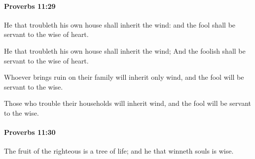 		\paragraph{Proverbs 11:29} %
			\label{PROVERBS-11-29}

			He that troubleth his own house shall inherit the wind: and the fool shall be servant to the wise of heart.

			\begin{versebox}
					\item[BHS] 
					\item[ASV] He that troubleth his own house shall inherit the wind; And the foolish shall be servant to the wise of heart.
					\item[NIV] Whoever brings ruin on their family will inherit only wind, and the fool will be servant to the wise.
					\item[NRSV] Those who trouble their households will inherit wind, and the fool will be servant to the wise.
			\end{versebox}

		\paragraph{Proverbs 11:30} %
			\label{PROVERBS-11-30}

			The fruit of the righteous is a tree of life; and he that winneth souls is wise.


